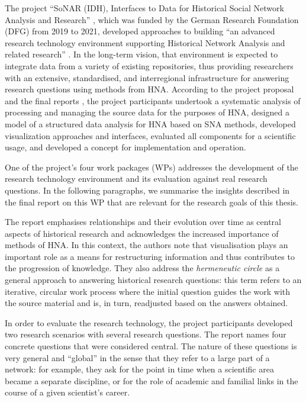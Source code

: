 The project \enquote{SoNAR (IDH),
Interfaces to Data for Historical Social Network Analysis
and Research} \autocite{Bludau2020,Menzel2020,SoNAR},
which was funded by the German Research Foundation (DFG)
from 2019 to 2021,
developed approaches to building 
\enquote{an advanced research technology environment
supporting Historical Network Analysis and related research} \autocite{SoNAR}.
In the long-term vision, that environment is expected to
integrate data from a variety of existing repositories,
thus providing researchers with an extensive,
standardised, and interregional infrastructure for answering research questions
using methods from HNA.
According to the project proposal and the final reports \autocite{SoNARreports},
the project participants undertook
a systematic analysis of processing and managing the source data
for the purposes of HNA,
designed a model of a structured data analysis for HNA based on SNA methods,
developed visualization approaches and interfaces,
evaluated all components for a scientific usage,
and developed a concept for implementation and operation.

One of the project's four work packages (WPs)
addresses the development of the research technology environment
and its evaluation against real research questions.
In the following paragraphs,
we summarise the insights described in the final report on this WP \autocite{Fangerau2022}
that are relevant for the research goals of this thesis.

The report emphasises relationships and their evolution over time
as central aspects of historical research and acknowledges the increased 
importance of methods of HNA. In this context, the authors note that visualisation plays an important role
as a means for restructuring information and thus contributes to the progression of knowledge.
They also address the \emph{hermeneutic circle} \autocite{Malpas2015}
as a general approach to answering historical research questions:
this term refers to an iterative, circular work process
where the initial question guides the work with the source material
and is, in turn, readjusted based on the answers obtained.

In order to evaluate the research technology,
the project participants developed two research scenarios
with several research questions.
The report names four concrete questions that were considered central.
The nature of these questions is very general and \enquote{global}
in the sense that they refer to a large part of a network:
for example, they ask for the point in time when a scientific area became a separate discipline,
or for the role of academic and familial links in the course of a given scientist's career.

